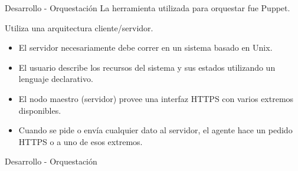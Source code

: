 \begin{frame}{Desarrollo - Orquestación}
    \vspace{-1.5cm}
    La herramienta utilizada para orquestar fue Puppet.

    Utiliza una arquitectura cliente/servidor.  
    \begin{itemize}
        \item El servidor necesariamente debe correr en un sistema basado en Unix.
        \item El usuario describe los recursos del sistema y sus estados utilizando un lenguaje declarativo.    
        \item El nodo maestro (servidor) provee una interfaz HTTPS con varios extremos disponibles.
        \item Cuando se pide o envía cualquier dato al servidor, el agente hace un pedido HTTPS o a uno de esos extremos. 
    \end{itemize}

\end{frame}


\begin{frame}{Desarrollo - Orquestación}
    \vspace{-1.5cm}
        \begin{figure}[ht]
           \centering
           \vspace{-0.50cm}
        \end{figure}

\end{frame}

